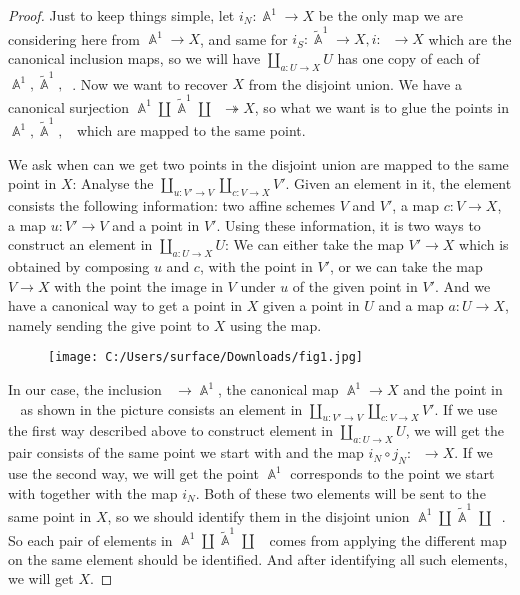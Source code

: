 \documentclass[a4paper]{article}
\DeclareMathOperator{\An}{\mathbb A}
\DeclareMathOperator{\Gm}{\mathbb G_m}
\begin{document}
\begin{proof}
       Just to keep things simple, let $i_N:\An^1\to X$ be the only map we are considering here from $\An^1\to X$, and same for $i_S:\widetilde{\An}^1\to X,i:\Gm\to X$ which are the canonical inclusion maps, so we will have $\coprod_{a:U\to X}U$ has one copy of each of $\An^1,\widetilde{\An}^1,\Gm$. Now we want to recover $X$ from the disjoint union. We have a canonical surjection $\An^1\coprod\widetilde{\An}^1\coprod\Gm\twoheadrightarrow X$, so what we want is to glue the points in $\An^1,\widetilde{\An}^1,\Gm$ which are mapped to the same point.

       We ask when can we get two points in the disjoint union are mapped to the same point in $X$: Analyse the $\underset{u:V'\to V}\coprod\underset{c:V\to X}\coprod V'$. Given an element in it, the element consists the following information: two affine schemes $V$ and $V'$, a map $c:V\to X$, a map $u:V'\to V$ and a point in $V'$. Using these information, it is two ways to construct an element in $\underset{a:U\to X}\coprod U$: We can either take the map $V'\to X$ which is obtained by composing $u$ and $c$, with the point in $V'$, or we can take the map $V\to X$ with the point the image in $V$ under $u$ of the given point in $V'$. And we have a canonical way to get a point in $X$ given a point in $U$ and a map $a:U\to X$, namely sending the give point to $X$ using the map. 

       \begin{figure}[ht]
        \centering
        \texttt{[image: C:/Users/surface/Downloads/fig1.jpg]}
       \end{figure}
       
       
       In our case, the inclusion $\Gm\to \An^1$, the canonical map $\An^1\to X$ and the point in $\Gm$ as shown in the picture consists an element in $\underset{u:V'\to V}\coprod\underset{c:V\to X}\coprod V'$. If we use the first way described above to construct element in $\underset{a:U\to X}\coprod U$, we will get the pair consists of the same point we start with and the map $i_N\circ j_N:\Gm\to X$. If we use the second way, we will get the point $\An^1$ corresponds to the point we start with together with the map $i_N$. Both of these two elements will be sent to the same point in $X$, so we should identify them in the disjoint union $\An^1\coprod\widetilde{\An}^1\coprod\Gm$. So each pair of elements in $\An^1\coprod\widetilde{\An}^1\coprod\Gm$ comes from applying the different map on the same element should be identified. And after identifying all such elements, we will get $X$.



\end{proof}
\end{document}
